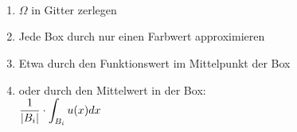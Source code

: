         \\
            \begin{minipage}[t]{0.4\linewidth}
                \
                \begin{center}
                \end{center}
            \end{minipage}
            \hfill\vrule\hfill
            \begin{minipage}[t]{0.59\linewidth}
                \
                \begin{center}
                    \begin{enumerate}[label=\textbullet]
                        \item $\Omega$ in Gitter zerlegen
                        \item Jede Box durch nur einen Farbwert approximieren
                        \item Etwa durch den Funktionswert im Mittelpunkt der Box
                        \item oder durch den Mittelwert in der Box:\\ $\displaystyle \frac{1}{\left| B_i \right|} \cdot \int_{B_i}u(x)dx$
                    \end{enumerate}
                \end{center}
            \end{minipage}

